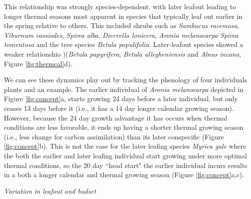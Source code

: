 \documentclass{article}[12pt]
\begin{document}
This relationship was strongly species-dependent. with later leafout leading to longer thermal seasons most apparent in species that typically leaf out earlier in the spring relative to others. This included shrubs such as \emph{Sambucus racemosa}, \emph{Viburnum cassiodes}, \emph{Spirea alba}, \emph{Diervella lonicera}, \emph{Aronia melanocarpa} \emph{Spirea tomentosa} and the tree species \emph{Betula populifolia}. Later-leafout species showed a weaker relationshio )(\emph{Betula papyrifera}, \emph{Betula allegheniensis} and \emph{Alnus incana}, Figure \ref{fig:thermcal}d). 

We can see these dynamics play out by tracking the phenology of four individuals plants and an example. The earlier individual of \emph{Aronia melanocarpa} depicted in Figure \ref{fig:concept}a, starts growing 24 days before a later individual, but only ceases 13 days before it (i.e., it has a 14 day longer calendar growing season). However, because the 24 day growth advantage it has occurs when thermal conditions are less favorable, it ends up having a shorter thermal growing season (i.e., less change for carbon assimilation) than its later conspecific (Figure \ref{fig:concept}b). This is not the case for the later leafing species \emph{Myrica gale} where the both the earlier and later leafing individual start growing under more optimal thermal conditions, so the 20 day ``head start" the earlier individual incurs results in a both a longer calendar and thermal growing season (Figure \ref{fig:concept}a,c). 

\emph{Variation in leafout and budset}\\
\end{document}
